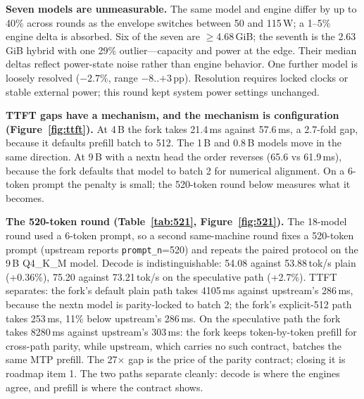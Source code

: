 \documentclass[letterpaper,twocolumn,10pt]{article}
\begin{document}
\textbf{Seven models are unmeasurable.} The same model and engine differ by up
to 40\% across rounds as the envelope switches between 50 and 115\,W; a 1--5\%
engine delta is absorbed. Six of the seven are $\ge$4.68\,GiB; the seventh is
the 2.63\,GiB hybrid with one 29\% outlier---capacity and power at the edge. Their median
deltas reflect power-state noise rather than engine behavior. One further
model is loosely resolved ($-2.7\%$, range $-8$..$+3$\,pp). Resolution requires
locked clocks or stable external power; this round kept system power settings
unchanged.

\textbf{TTFT gaps have a mechanism, and the mechanism is configuration
(Figure~\ref{fig:ttft}).} At 4\,B the fork takes 21.4\,ms against 57.6\,ms, a
2.7-fold gap, because it defaults prefill batch to 512. The 1\,B and 0.8\,B
models move in the same direction. At 9\,B with a nextn head the order
reverses (65.6 vs 61.9\,ms), because the fork defaults that model to batch 2
for numerical alignment. On a 6-token prompt the penalty is small; the
520-token round below measures what it becomes.

\textbf{The 520-token round (Table~\ref{tab:521}, Figure~\ref{fig:521}).} The
18-model round used a 6-token prompt, so a second same-machine round fixes a
520-token prompt (upstream reports \texttt{prompt\_n}=520) and repeats the
paired protocol on the 9\,B Q4\_K\_M model. Decode is indistinguishable:
54.08 against 53.88\,tok/s plain (+0.36\%), 75.20 against 73.21\,tok/s on the
speculative path (+2.7\%). TTFT separates: the fork's default plain path takes
4105\,ms against upstream's 286\,ms, because the nextn model is parity-locked
to batch 2; the fork's explicit-512 path takes 253\,ms, 11\% below upstream's
286\,ms. On the speculative path the fork takes 8280\,ms against upstream's
303\,ms: the fork keeps token-by-token prefill for cross-path parity, while
upstream, which carries no such contract, batches the same MTP prefill. The
27$\times$ gap is the price of the parity contract; closing it is roadmap
item 1. The two paths separate cleanly: decode is where the engines agree, and
prefill is where the contract shows.
\end{document}
